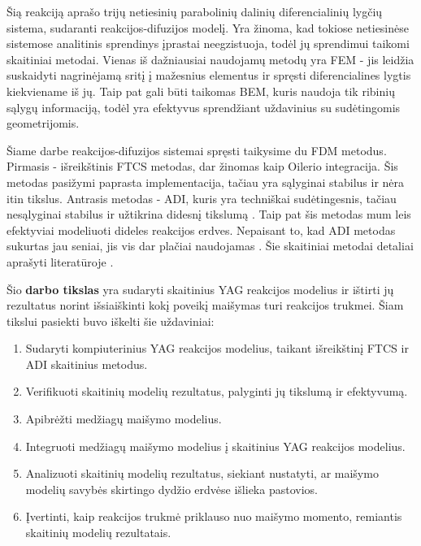 Šią reakciją aprašo trijų netiesinių parabolinių dalinių diferencialinių lygčių sistema, sudaranti reakcijos-difuzijos modelį. Yra žinoma, kad tokiose netiesinėse sistemose analitinis sprendinys įprastai neegzistuoja, todėl jų sprendimui taikomi skaitiniai metodai. Vienas iš dažniausiai naudojamų metodų yra FEM - jis leidžia suskaidyti nagrinėjamą sritį į mažesnius elementus ir spręsti diferencialines lygtis kiekviename iš jų. Taip pat gali būti taikomas BEM, kuris naudoja tik ribinių sąlygų informaciją, todėl yra efektyvus sprendžiant uždavinius su sudėtingomis geometrijomis.

Šiame darbe reakcijos-difuzijos sistemai spręsti taikysime du FDM metodus. Pirmasis - išreikštinis FTCS metodas, dar žinomas kaip Oilerio integracija. Šis metodas pasižymi paprasta implementacija, tačiau yra sąlyginai stabilus ir nėra itin tikslus. Antrasis metodas - ADI, kuris yra techniškai sudėtingesnis, tačiau nesąlyginai stabilus ir užtikrina didesnį tikslumą \cite{doi:10.1137/0103003}. Taip pat šis metodas mum leis efektyviai modeliuoti dideles reakcijos erdves. Nepaisant to, kad ADI metodas sukurtas jau seniai, jis vis dar plačiai naudojamas \cite{gaidamauskaiteComparisonFiniteDifference2007}. Šie skaitiniai metodai detaliai aprašyti literatūroje \cite{pressNumericalRecipes3rd2007,levequeFiniteDifferenceMethods2007}.

Šio \textbf{darbo tikslas} yra sudaryti skaitinius YAG reakcijos modelius ir ištirti jų rezultatus norint išsiaiškinti kokį poveikį maišymas turi reakcijos trukmei. Šiam tikslui pasiekti buvo iškelti šie uždaviniai:


\begin{enumerate}
  \item Sudaryti kompiuterinius YAG reakcijos modelius, taikant išreikštinį FTCS ir ADI skaitinius metodus.
  \item Verifikuoti skaitinių modelių rezultatus, palyginti jų tikslumą ir efektyvumą.
  \item Apibrėžti medžiagų maišymo modelius.
  \item Integruoti medžiagų maišymo modelius į skaitinius YAG reakcijos modelius.
  \item Analizuoti skaitinių modelių rezultatus, siekiant nustatyti, ar maišymo modelių savybės skirtingo dydžio erdvėse išlieka pastovios.
  \item Įvertinti, kaip reakcijos trukmė priklauso nuo maišymo momento, remiantis skaitinių modelių rezultatais.
\end{enumerate}
